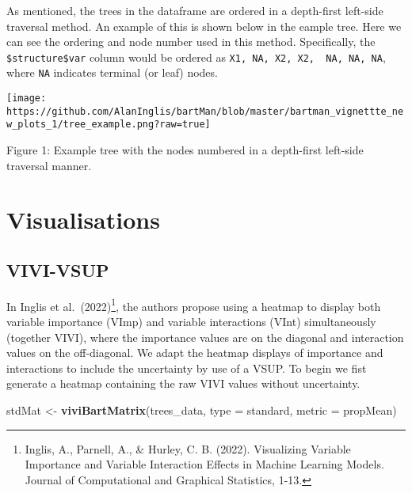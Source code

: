 \documentclass[
]{article}
\newenvironment{Shaded}{\begin{snugshade}}{\end{snugshade}}
\newcommand{\AttributeTok}[1]{\textcolor[rgb]{0.13,0.29,0.53}{#1}}
\newcommand{\FunctionTok}[1]{\textcolor[rgb]{0.13,0.29,0.53}{\textbf{#1}}}
\newcommand{\NormalTok}[1]{#1}
\newcommand{\OtherTok}[1]{\textcolor[rgb]{0.56,0.35,0.01}{#1}}
\newcommand{\StringTok}[1]{\textcolor[rgb]{0.31,0.60,0.02}{#1}}
\begin{document}
As mentioned, the trees in the dataframe are ordered in a depth-first
left-side traversal method. An example of this is shown below in the
eample tree. Here we can see the ordering and node number used in this
method. Specifically, the \texttt{\$structure\$var} column would be
ordered as \texttt{X1,\ NA,\ X2,\ X2,\ \ NA,\ NA,\ NA}, where
\texttt{NA} indicates terminal (or leaf) nodes.

\begin{center}\texttt{[image: https://github.com/AlanInglis/bartMan/blob/master/bartman\_vignettte\_new\_plots\_1/tree\_example.png?raw=true]} \end{center}

\protect\hypertarget{fig1:fig1}{}{Figure 1: } Example tree with the
nodes numbered in a depth-first left-side traversal manner.

\hypertarget{visualisations}{%
\section{Visualisations}\label{visualisations}}

\hypertarget{vivi-vsup}{%
\subsection{VIVI-VSUP}\label{vivi-vsup}}

In Inglis et al.~(2022)\footnote{Inglis, A., Parnell, A., \& Hurley, C.
  B. (2022). Visualizing Variable Importance and Variable Interaction
  Effects in Machine Learning Models. Journal of Computational and
  Graphical Statistics, 1-13.}, the authors propose using a heatmap to
display both variable importance (VImp) and variable interactions (VInt)
simultaneously (together VIVI), where the importance values are on the
diagonal and interaction values on the off-diagonal. We adapt the
heatmap displays of importance and interactions to include the
uncertainty by use of a VSUP. To begin we fist generate a heatmap
containing the raw VIVI values without uncertainty.

\begin{Shaded}
\begin{Highlighting}[]
\NormalTok{stdMat }\OtherTok{\textless{}{-}} \FunctionTok{viviBartMatrix}\NormalTok{(trees\_data,}
                          \AttributeTok{type =} \StringTok{\textquotesingle{}standard\textquotesingle{}}\NormalTok{,}
                          \AttributeTok{metric =} \StringTok{\textquotesingle{}propMean\textquotesingle{}}\NormalTok{)}
\end{Highlighting}
\end{Shaded}
\end{document}
